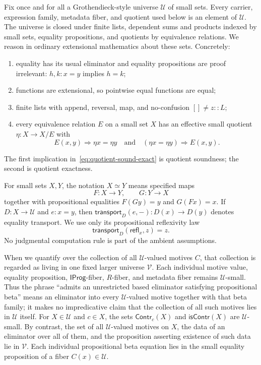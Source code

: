 \documentclass[10pt,reqno]{amsart}
\newcommand{\IProg}{\mathsf{IProg}}
\begin{document}
Fix once and for all a Grothendieck-style universe \(\mathcal U\) of small
sets.  Every carrier, expression family, metadata fiber, and quotient used
below is an element of \(\mathcal U\).  The universe is closed under finite
lists, dependent sums and products indexed by small sets, equality
propositions, and quotients by equivalence relations.  We reason in ordinary
extensional mathematics about these sets.  Concretely:
\begin{enumerate}
\item equality has its usual eliminator and equality propositions are proof
  irrelevant:
  \(h,k:x=y\) implies \(h=k\);
\item functions are extensional, so pointwise equal functions are equal;
\item finite lists with append, reversal, map, and no-confusion
  \([]\neq z::L\);
\item every equivalence relation \(E\) on a small set \(X\) has an effective
  small quotient
  \(\eta:X\to X/E\) with
  \[
       E(x,y)\Longrightarrow\eta x=\eta y
       \quad\text{and}\quad
       (\eta x=\eta y)\Longrightarrow E(x,y).
  \tag{2.1}\label{eq:quotient-sound-exact}
  \]
\end{enumerate}
The first implication in~\eqref{eq:quotient-sound-exact} is quotient
soundness; the second is quotient exactness.

For small sets \(X,Y\), the notation \(X\simeq Y\) means specified maps
\[
 F:X\to Y,\qquad G:Y\to X
\]
together with propositional equalities
\(F(Gy)=y\) and \(G(Fx)=x\).  If \(D:X\to\mathcal U\) and \(e:x=y\), then
\(\mathsf{transport}_D(e,-):D(x)\to D(y)\) denotes equality transport.
We use only its propositional reflexivity law
\[
 \mathsf{transport}_D(\mathsf{refl}_x,z)=z.
\tag{2.2}\label{eq:transport-beta}
\]
No judgmental computation rule is part of the ambient assumptions.

When we quantify over the collection of all \(\mathcal U\)-valued motives
\(C\), that collection is regarded as living in one fixed larger universe
\(\mathcal V\).  Each individual motive value, equality proposition,
\(\IProg\)-fiber, \(R\)-fiber, and metadata fiber remains
\(\mathcal U\)-small.  Thus the phrase ``admits an unrestricted based
eliminator satisfying propositional beta'' means an eliminator into every
\(\mathcal U\)-valued motive together with that beta family; it makes no
impredicative claim that
the collection of all such motives lies in \(\mathcal U\) itself.
For \(X\in\mathcal U\) and \(c\in X\), the sets
\(\mathsf{Contr}_c(X)\) and \(\mathsf{isContr}(X)\) are
\(\mathcal U\)-small.  By contrast, the set of all
\(\mathcal U\)-valued motives on \(X\), the data of an eliminator over all of
them, and the proposition asserting existence of such data lie in
\(\mathcal V\).  Each individual propositional beta equation lies in the
small equality proposition of a fiber \(C(x)\in\mathcal U\).
\end{document}
